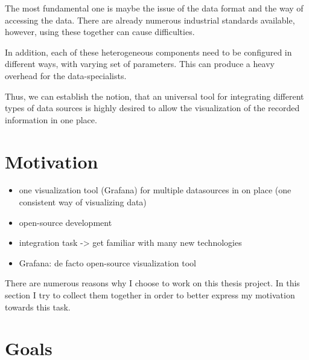 The most fundamental one is maybe the issue of the data format and the way of accessing the data. There are already numerous industrial standards available, however, using these together can cause difficulties.

In addition, each of these heterogeneous components need to be configured in different ways, with varying set of parameters. This can produce a heavy overhead for the data-specialists.

Thus, we can establish the notion, that an universal tool for integrating different types of data sources is highly desired to allow the visualization of the recorded information in one place.

\section{Motivation}

\begin{itemize}
	\item one visualization tool (Grafana) for multiple datasources in on place (one consistent way of visualizing data)
	\item open-source development
	\item integration task -> get familiar with many new technologies
	\item Grafana: de facto open-source visualization tool
\end{itemize}

There are numerous reasons why I choose to work on this thesis project. In this section I try to collect them together in order to better express my motivation towards this task.




\section{Goals}

